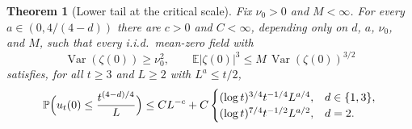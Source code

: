\documentclass[11pt]{amsart}
\theoremstyle{plain}
\newtheorem{theorem}{Theorem}[section]
\theoremstyle{definition}
\newcommand{\E}{\mathbb{E}}
\renewcommand{\P}{\mathbb{P}}
\DeclareMathOperator{\Var}{Var}
\begin{document}
\begin{theorem}[Lower tail at the critical scale]\label{thm:critical-toppling}
	Fix $\nu_0>0$ and $M<\infty$. For every $a\in(0,4/(4-d))$ there are $c>0$
	and $C<\infty$, depending only on $d$, $a$, $\nu_0$, and $M$, such that
	every i.i.d.\ mean-zero field with
	\[
		\Var(\zeta(0))\geq\nu_0^2,
		\qquad
		\E|\zeta(0)|^3\leq M\,\Var(\zeta(0))^{3/2}
	\]
	satisfies, for all $t\geq3$ and $L\geq2$ with $L^a\leq t/2$,
	\begin{equation}\label{eq:dlt4-green-lower-tail}
		\P\Bigl(u_t(0)\leq \frac{t^{(4-d)/4}}{L}\Bigr)
		\leq CL^{-c}+C
		\begin{cases}
			(\log t)^{3/4}t^{-1/4}L^{a/4},&d\in\{1,3\},\\
			(\log t)^{7/4}t^{-1/2}L^{a/2},&d=2.
		\end{cases}
	\end{equation}
\end{theorem}
\end{document}
